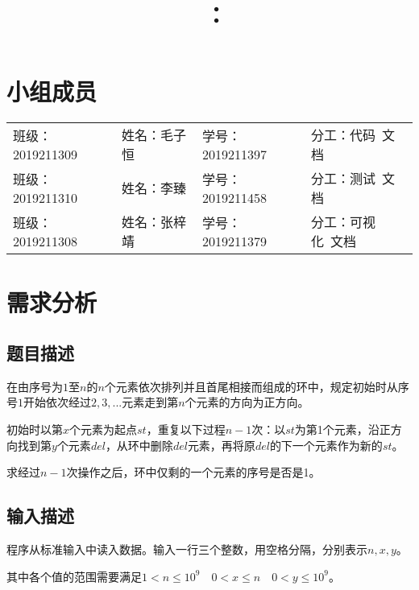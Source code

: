 \documentclass{article}
\title{\hmwkClass\ ：\hmwkTitle}
\author{\hmwkAuthorName}
\begin{document}
\maketitle

\section*{小组成员}

\setlength{\tabcolsep}{9mm}
{
    \begin{table}[htbp]
        \centering
        \begin{tabular}{llll}
            班级：2019211309 & 姓名：毛子恒 & 学号：2019211397 & 分工：代码\ 文档   \\
            
            班级：2019211310 & 姓名：李臻   & 学号：2019211458 & 分工：测试\ 文档   \\
            
            班级：2019211308 & 姓名：张梓靖 & 学号：2019211379 & 分工：可视化\ 文档 \\
        \end{tabular}
    \end{table}
}

\section{需求分析}

\subsection{题目描述}

在由序号为$1$至$n$的$n$个元素依次排列并且首尾相接而组成的环中，规定初始时从序号$1$开始依次经过$2,3,...$元素走到第$n$个元素的方向为正方向。

初始时以第$x$个元素为起点$st$，重复以下过程$n-1$次：以$st$为第1个元素，沿正方向找到第$y$个元素$del$，从环中删除$del$元素，再将原$del$的下一个元素作为新的$st$。

求经过$n-1$次操作之后，环中仅剩的一个元素的序号是否是1。

\subsection{输入描述}

程序从标准输入中读入数据。输入一行三个整数，用空格分隔，分别表示$n,x,y$。

其中各个值的范围需要满足$1 < n \leq 10^9\quad 0 < x \leq n\quad 0 < y \leq 10^9$。
\end{document}
